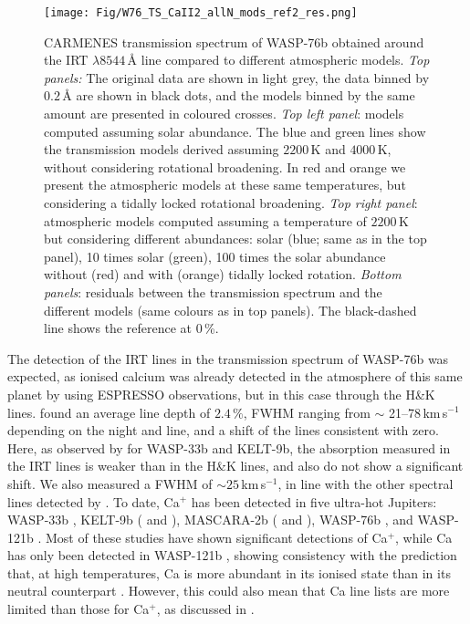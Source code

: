 \documentclass{aa}
\begin{document}
\begin{figure*}[]
\centering
\texttt{[image: Fig/W76\_TS\_CaII2\_allN\_mods\_ref2\_res.png]}
\caption{CARMENES transmission spectrum of WASP-76b obtained around the  IRT $\lambda8544$\,{\AA} line compared to different atmospheric models. {\em Top panels:} The original data are shown in light grey, the data binned by $0.2$\,{\AA} are shown in black dots, and the models binned by the same amount are presented in coloured crosses. {\em Top left panel}: models computed assuming solar abundance. The blue and green lines show the transmission models derived assuming $2200$\,K and $4000$\,K, without considering rotational broadening. In red and orange we present the atmospheric models at these same temperatures, but considering a tidally locked rotational broadening. {\em Top right panel}: atmospheric models computed assuming a temperature of $2200$\,K but considering different abundances: solar (blue; same as in the top panel), 10 times solar (green), 100 times the solar abundance without (red) and with (orange) tidally locked rotation. {\em Bottom panels}: residuals between the transmission spectrum and the different models (same colours as in top panels). The black-dashed line shows the reference at $0$\,{\%}.}
\label{fig:TS_CaIRT_mod}
\end{figure*}


The detection of the  IRT lines in the transmission spectrum of WASP-76b was expected, as ionised calcium was already detected in the atmosphere of this same planet by \citet{Tabernero2020} using ESPRESSO observations, but in this case through the  H\&K lines. \citet{Tabernero2020} found an average line depth of $2.4\,\%$, FWHM ranging from $\sim$ 21--78\,km\,s$^{-1}$ depending on the night and line, and a shift of the lines consistent with zero. Here, as observed by \citet{Yan2019} for WASP-33b and KELT-9b, the absorption measured in the  IRT lines is weaker than in the  H\&K lines, and also do not show a significant shift. 
We also measured a FWHM of $\sim 25$\,km\,s$^{-1}$, in line with the other spectral lines detected by \citet{Tabernero2020}. To date, Ca$^+$ has been detected in five ultra-hot Jupiters: WASP-33b \citep{Yan2019}, KELT-9b (\citealt{Yan2019} and \citealt{Turner2020}), MASCARA-2b (\citealt{Casasayas2019} and \citealt{Nugroho2020}), WASP-76b \citep{Tabernero2020}, and WASP-121b \citep{Borsa2020}. Most of these studies have shown significant detections of Ca$^+$, while Ca has only been detected in WASP-121b \citep{Hoeijmakers2020_wasp121b}, showing consistency with the prediction that, at high temperatures, Ca is more abundant in its ionised state than in its neutral counterpart \citep{Helling2019}. However, this could also mean that Ca line lists are more limited than those for Ca$^+$, as discussed in \citet{Helling2021a}. 
\end{document}
